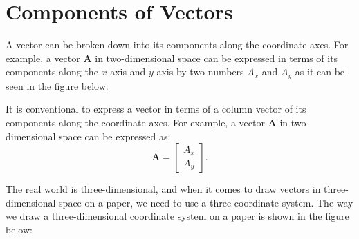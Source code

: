 \documentclass[12pt]{article}
\begin{document}
\section{Components of Vectors}
A vector can be broken down into its components along the coordinate axes. For example, a vector \(\mathbf{A}\) in two-dimensional space can be expressed in terms of its components along the \(x\)-axis and \(y\)-axis by two numbers \(A_x\) and \(A_y\) as it can be seen in the figure below.


\begin{figure}[h]
\centering
{}
\end{figure}

It is conventional to express a vector in terms of a column vector of its components along the coordinate axes. For example, a vector \(\mathbf{A}\) in two-dimensional space can be expressed as:
\[
\mathbf{A} = \begin{bmatrix} A_x \\ A_y \end{bmatrix}.
\]  


The real world is three-dimensional, and when it comes to draw vectors in three-dimensional space on a paper, we need to use a three coordinate system. The way we draw a three-dimensional coordinate system on a paper is shown in the figure below:

\begin{center}
\end{center}
\end{document}
